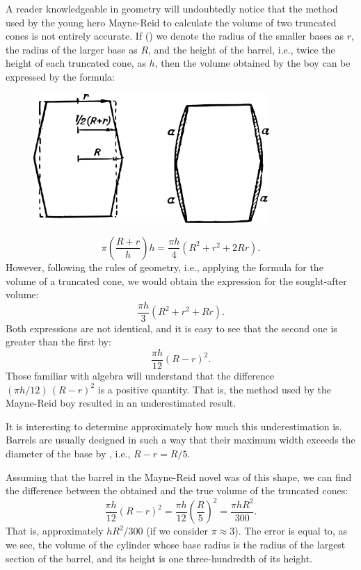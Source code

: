 A reader knowledgeable in geometry will undoubtedly notice that the method used by the young hero Mayne-Reid to calculate the volume of two truncated cones is not entirely accurate. If () we denote the radius of the smaller bases as $r$, the radius of the larger base as $R$, and the height of the barrel, i.e., twice the height of each truncated cone, as $h$, then the volume obtained by the boy can be expressed by the formula:
\begin{figure}[h!]
\centering
\includegraphics[width=0.8\textwidth]{figures/ch-08/fig-109.pdf}
\end{figure}
\begin{equation*}%
\pi \left( \frac{R + r}{h} \right) h = \frac{\pi h}{4} (R^{2} + r^{2} + 2Rr).
\end{equation*}
However, following the rules of geometry, i.e., applying the formula for the volume of a truncated cone, we would obtain the expression for the sought-after volume:
\begin{equation*}%
\frac{\pi h}{3} (R^{2} + r^{2} + Rr).
\end{equation*}
Both expressions are not identical, and it is easy to see that the second one is greater than the first by:
\begin{equation*}%
\frac{\pi h}{12} (R - r)^{2}.
\end{equation*}
Those familiar with algebra will understand that the difference  $(πh/12) \, (R - r)^{2}$ is a positive quantity. That is, the method used by the Mayne-Reid boy resulted in an underestimated result.

It is interesting to determine approximately how much this underestimation is. Barrels are usually designed in such a way that their maximum width exceeds the diameter of the base by , i.e., $R - r = R/5$.

Assuming that the barrel in the Mayne-Reid novel was of this shape, we can find the difference between the obtained and the true volume of the truncated cones:
\begin{equation*}%
\frac{\pi h}{12} (R - r)^{2} = \frac{\pi h}{12} \left(\frac{R}{5}\right)^{2} = \frac{\pi hR^{2}}{300}.
\end{equation*}
That is, approximately $hR^{2}/300$ (if we consider $\pi \approx 3 $). The error is equal to, as we see, the volume of the cylinder whose base radius is the radius of the largest section of the barrel, and its height is one three-hundredth of its height.

